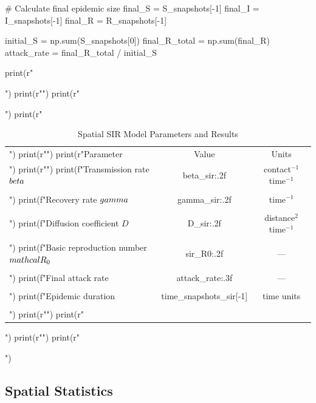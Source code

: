 \documentclass[a4paper, 11pt]{article}
\begin{document}
\begin{pycode}
# Calculate final epidemic size
final_S = S_snapshots[-1]
final_I = I_snapshots[-1]
final_R = R_snapshots[-1]

initial_S = np.sum(S_snapshots[0])
final_R_total = np.sum(final_R)
attack_rate = final_R_total / initial_S

print(r"\begin{table}[htbp]")
print(r"\centering")
print(r"\caption{Spatial SIR Model Parameters and Results}")
print(r"\begin{tabular}{lcc}")
print(r"\toprule")
print(r"Parameter & Value & Units \\")
print(r"\midrule")
print(f"Transmission rate $\\beta$ & {beta_sir:.2f} & contact$^{{-1}}$ time$^{{-1}}$ \\\\")
print(f"Recovery rate $\\gamma$ & {gamma_sir:.2f} & time$^{{-1}}$ \\\\")
print(f"Diffusion coefficient $D$ & {D_sir:.2f} & distance$^2$ time$^{{-1}}$ \\\\")
print(f"Basic reproduction number $\\mathcal{{R}}_0$ & {sir_R0:.2f} & --- \\\\")
print(f"Final attack rate & {attack_rate:.3f} & --- \\\\")
print(f"Epidemic duration & {time_snapshots_sir[-1]} & time units \\\\")
print(r"\bottomrule")
print(r"\end{tabular}")
print(r"\label{tab:spatial_sir}")
print(r"\end{table}")
\end{pycode}

\subsection{Spatial Statistics}
\end{document}
